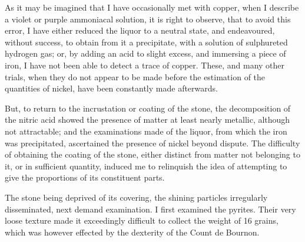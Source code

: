 \documentclass[a4paper, 12pt, oneside]{article}
\begin{document}
As it may be imagined that I have occasionally met with copper, when I describe a violet or purple ammoniacal solution, it is right to observe, that to avoid this error, I have either reduced the liquor to a neutral state, and endeavoured, without success, to obtain from it a precipitate, with a solution of sulphureted hydrogen gas; or, by adding an acid to slight excess, and immersing a piece of iron, I have not been able to detect a trace of copper. These, and many other trials, when they do not appear to be made before the estimation of the quantities of nickel, have been constantly made afterwards.

But, to return to the incrustation or coating of the stone, the decomposition of the nitric acid showed the presence of matter at least nearly metallic, although not attractable; and the examinations made of the liquor, from which the iron was precipitated, ascertained the presence of nickel beyond dispute. The difficulty of obtaining the coating of the stone, either distinct from matter not belonging to it, or in sufficient quantity, induced me to relinquish the idea of attempting to give the proportions of its constituent parts.

The stone being deprived of its covering, the shining particles irregularly disseminated, next demand examination. I first examined the pyrites. Their very loose texture made it exceedingly difficult to collect the weight of 16 grains, which was however effected by the dexterity of the Count de Bournon.
\end{document}
